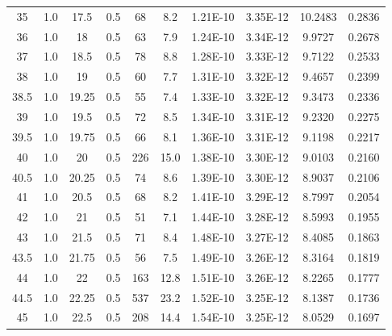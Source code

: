 \documentclass[justified]{tufte-book}
\begin{document}
\begin{table}[ht]
\begin{tabular}{cccccccccc}
35        & 1.0 & 17.5     & 0.5         & 68    & 8.2      & 1.21E-10      & 3.35E-12         & 10.2483      & 0.2836 \\
36        & 1.0 & 18       & 0.5         & 63    & 7.9      & 1.24E-10      & 3.34E-12         & 9.9727       & 0.2678 \\
37        & 1.0 & 18.5     & 0.5         & 78    & 8.8      & 1.28E-10      & 3.33E-12         & 9.7122       & 0.2533 \\
38        & 1.0 & 19       & 0.5         & 60    & 7.7      & 1.31E-10      & 3.32E-12         & 9.4657       & 0.2399 \\
38.5        & 1.0 & 19.25    & 0.5         & 55    & 7.4      & 1.33E-10      & 3.32E-12         & 9.3473       & 0.2336 \\
39        & 1.0 & 19.5     & 0.5         & 72    & 8.5      & 1.34E-10      & 3.31E-12         & 9.2320       & 0.2275 \\
39.5        & 1.0 & 19.75    & 0.5         & 66    & 8.1      & 1.36E-10      & 3.31E-12         & 9.1198       & 0.2217 \\
40        & 1.0 & 20       & 0.5         & 226   & 15.0     & 1.38E-10      & 3.30E-12         & 9.0103       & 0.2160 \\
40.5        & 1.0 & 20.25    & 0.5         & 74    & 8.6      & 1.39E-10      & 3.30E-12         & 8.9037       & 0.2106 \\
41        & 1.0 & 20.5     & 0.5         & 68    & 8.2      & 1.41E-10      & 3.29E-12         & 8.7997       & 0.2054 \\
42        & 1.0 & 21       & 0.5         & 51    & 7.1      & 1.44E-10      & 3.28E-12         & 8.5993       & 0.1955 \\
43        & 1.0 & 21.5     & 0.5         & 71    & 8.4      & 1.48E-10      & 3.27E-12         & 8.4085       & 0.1863 \\
43.5        & 1.0 & 21.75    & 0.5         & 56    & 7.5      & 1.49E-10      & 3.26E-12         & 8.3164       & 0.1819 \\
44        & 1.0 & 22       & 0.5         & 163   & 12.8     & 1.51E-10      & 3.26E-12         & 8.2265       & 0.1777 \\
44.5        & 1.0 & 22.25    & 0.5         & 537   & 23.2     & 1.52E-10      & 3.25E-12         & 8.1387       & 0.1736 \\
45        & 1.0 & 22.5     & 0.5         & 208   & 14.4     & 1.54E-10      & 3.25E-12         & 8.0529       & 0.1697 \\

\end{tabular}
\end{table}
\end{document}
